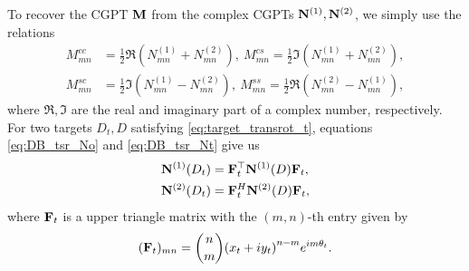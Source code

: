 To recover the CGPT $\mathbf{M}$ from the complex CGPTs $\mathbf{N}^{(1)}, \mathbf{N}^{(2)}$,
we simply use the relations
\begin{equation}
  \label{eq:CGPT_CCGPT_recovery}
  \begin{aligned}
    M_{mn}^{cc} &= \frac{1}{2} \Re(N_{mn}^{(1)} + N_{mn}^{(2)}), \ M_{mn}^{cs} = \frac{1}{2} \Im(N_{mn}^{(1)} + N_{mn}^{(2)}),\\
    M_{mn}^{sc} &= \frac{1}{2} \Im(N_{mn}^{(1)} - N_{mn}^{(2)}), \ M_{mn}^{ss} = \frac{1}{2} \Re(N_{mn}^{(2)} -
    N_{mn}^{(1)}),
  \end{aligned}
\end{equation}
where $\Re,\Im$ are the real and imaginary part of a complex
number, respectively. For two targets $D_t, D$ satisfying
\eqref{eq:target_transrot_t}, equations \eqref{eq:DB_tsr_No} and \eqref{eq:DB_tsr_Nt} give us
\begin{subequations}
  \label{eq:CCGPT_tsr}
  \begin{align}
    \mathbf{N}^{(1)}(D_t) &= \mathbf{F}_t^\top \mathbf{N}^{(1)}(D) \mathbf{F}_t, \\
    \mathbf{N}^{(2)}(D_t) &= \mathbf{F}_t^H \mathbf{N}^{(2)}(D) \mathbf{F}_t ,
  \end{align}
\end{subequations}
where $\mathbf{F}_t$ is a upper triangle matrix with the $(m,n)$-th entry given by
\begin{align}
  \label{eq:Fmat_mn}
  (\mathbf{F}_t)_{mn} = \binom{n}{m} {(x_t + i y_t)}^{n-m}e^{im\theta_t} .
\end{align}

